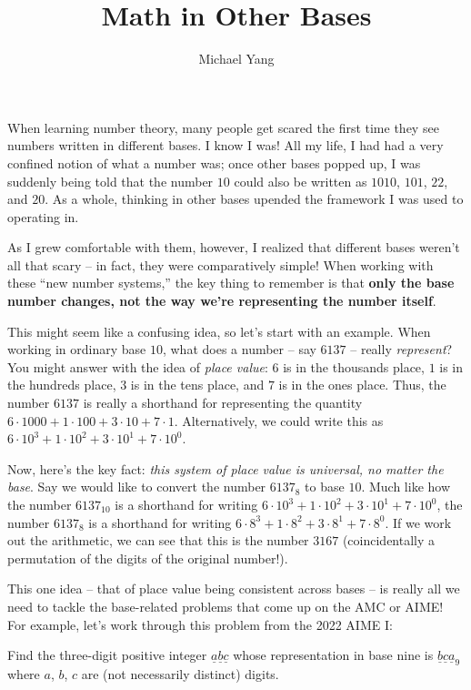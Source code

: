 \documentclass{article}
\title{Math in Other Bases}
\author{Michael Yang}
\begin{document}
\maketitle
When learning number theory, many people get scared the first time they see numbers written in different bases. I know I was! All my life, I had had a very confined notion of what a number was; once other bases popped up, I was suddenly being told that the number $10$ could also be written as $1010$, $101$, $22$, and $20$. As a whole, thinking in other bases upended the framework I was used to operating in.

As I grew comfortable with them, however, I realized that different bases weren’t all that scary -- in fact, they were comparatively simple! When working with these “new number systems,” the key thing to remember is that \textbf{only the base number changes, not the way we’re representing the number itself}. 

This might seem like a confusing idea, so let’s start with an example. When working in ordinary base $10$, what does a number -- say $6137$ -- really \textit{represent}? You might answer with the idea of \textit{place value}: $6$ is in the thousands place, $1$ is in the hundreds place, $3$ is in the tens place, and $7$ is in the ones place.
Thus, the number $6137$ is really a shorthand for representing the quantity $6\cdot 1000 + 1\cdot 100 + 3\cdot 10+7\cdot 1$. Alternatively, we could write this as $6\cdot 10^3+1\cdot 10^2+3\cdot 10^1+7\cdot 10^0$. 

Now, here’s the key fact: \textit{this system of place value is universal, no matter the base}. Say we would like to convert the number $6137_8$ to base $10$. 
Much like how the number $6137_{10}$ is a shorthand for writing $6\cdot{10}^3+1\cdot{10}^2+3\cdot 10^{1}+7\cdot 10^{0}$, the number $6137_8$ is a shorthand for writing $6\cdot 8^3+1\cdot 8^2+3\cdot 8^{1}+7\cdot 8^{0}$. If we work out the arithmetic, we can see that this is the number $3167$ (coincidentally a permutation of the digits of the original number!).

This one idea -- that of place value being consistent across bases -- is really all we need to tackle the base-related problems that come up on the AMC or AIME! For example, let's work through this problem from the 2022 AIME I:

Find the three-digit positive integer $\underline{a} \underline{b} \underline{c}$ whose representation in base nine is  $\underline{b}\underline{c}\underline{a}_9$ where $a$, $b$, $c$ are (not necessarily distinct) digits. 
\end{document}
